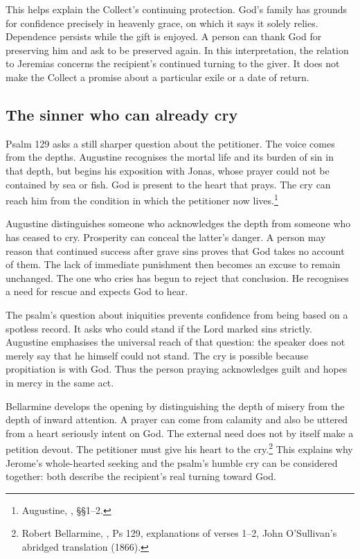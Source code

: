 This helps explain the Collect's continuing protection. God's family
has grounds for confidence precisely in heavenly grace, on which it
says it solely relies. Dependence persists while the gift is enjoyed.
A person can thank God for preserving him and ask to be preserved
again. In this interpretation, the relation to Jeremias concerns the
recipient's continued turning to the giver. It does not make the
Collect a promise about a particular exile or a date of return.

\subsection{The sinner who can already cry}
Psalm 129 asks a still sharper question about the petitioner. The
voice comes from the depths. Augustine recognises the mortal life
and its burden of sin in that depth, but begins his exposition with
Jonas, whose prayer could not be contained by sea or fish. God is
present to the heart that prays. The cry can reach him from the
condition in which the petitioner now lives.\footnote{Augustine,
, §§1--2.}

Augustine distinguishes someone who acknowledges the depth from
someone who has ceased to cry. Prosperity can conceal the latter's
danger. A person may reason that continued success after grave sins
proves that God takes no account of them. The lack of immediate
punishment then becomes an excuse to remain unchanged. The one who
cries has begun to reject that conclusion. He recognises a need for
rescue and expects God to hear.

The psalm's question about iniquities prevents confidence from being
based on a spotless record. It asks who could stand if the Lord
marked sins strictly. Augustine emphasises the universal reach of
that question: the speaker does not merely say that he himself could
not stand. The cry is possible because propitiation is with God.
Thus the person praying acknowledges guilt and hopes in mercy in
the same act.

Bellarmine develops the opening by distinguishing the depth of misery
from the depth of inward attention. A prayer can come from calamity
and also be uttered from a heart seriously intent on God. The
external need does not by itself make a petition devout. The
petitioner must give his heart to the cry.\footnote{Robert Bellarmine,
, Ps 129, explanations of
verses 1--2, John O'Sullivan's abridged translation (1866).}
This explains why Jerome's whole-hearted seeking and the psalm's
humble cry can be considered together: both describe the recipient's
real turning toward God.

